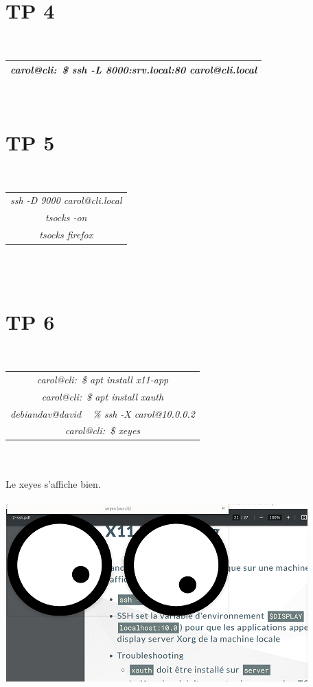 \documentclass{report}
\begin{document}
\section{TP 4}
\\
\begin{tabular}{|c|}
\hline
\textit{carol@cli:~\$ ssh -L 8000:srv.local:80 carol@cli.local}\\
\hline
\end{tabular}
\\
\section{TP 5}
\\
\begin{tabular}{|c|}
\hline
\textit{ssh -D 9000 carol@cli.local}\\
\textit{tsocks -on}\\
\textit{tsocks firefox}\\
\hline
\end{tabular}
\\
\\
\section{TP 6}
\\
\begin{tabular}{|c|}
\hline
\textit{carol@cli:~\$ apt install x11-app}\\
\textit{carol@cli:~\$ apt install xauth}\\
\textit{debiandav@david ~ \% ssh -X carol@10.0.0.2}\\
\textit{carol@cli:~\$ xeyes}\\
\hline
\end{tabular}
\\
\\
Le xeyes s'affiche bien. 
\\
\\
\includegraphics{xeyes}
\\
\\
\end{document}
